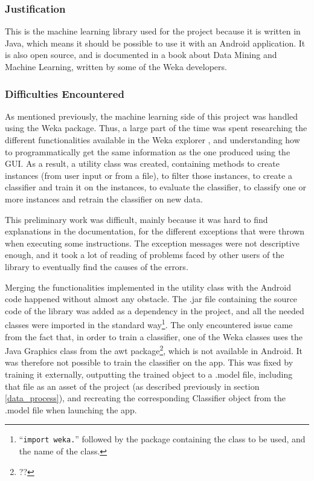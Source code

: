 \documentclass{mproj}
\begin{document}
\subsubsection*{Justification}

This is the machine learning library used for the project because it is written in Java, which means it should be possible to use it with an Android application. It is also open source, and is documented in a book about Data Mining and Machine Learning, written by some of the Weka developers. \cite{wekabook}

\subsubsection*{Difficulties Encountered}

As mentioned previously, the machine learning side of this project was handled using the Weka package. Thus, a large part of the time was spent researching the different functionalities available in the Weka explorer \cite{wekaexplorer}, and understanding how to programmatically get the same information as the one produced using the GUI. As a result, a utility class was created, containing methods to create instances (from user input or from a file), to filter those instances, to create a classifier and train it on the instances, to evaluate the classifier, to classify one or more instances and retrain the classifier on new data. \par

This preliminary work was difficult, mainly because it was hard to find explanations in the documentation, for the different exceptions that were thrown when executing some instructions. The exception messages were not descriptive enough, and it took a lot of reading of problems faced by other users of the library to eventually find the causes of the errors. \par

Merging the functionalities implemented in the utility class with the Android code happened without almost any obstacle. The .jar file containing the source code of the library was added as a dependency in the project, and all the needed classes were imported in the standard way\footnote{``\texttt{import weka.}'' followed by the package containing the class to be used, and the name of the class.}. The only encountered issue came from the fact that, in order to train a classifier, one of the Weka classes uses the Java Graphics class from the awt package\footnote{??}, which is not available in Android. It was therefore not possible to train the classifier on the app. This was fixed by training it externally, outputting the trained object to a .model file, including that file as an asset of the project (as described previously in section \ref{data_process}), and recreating the corresponding Classifier object from the .model file when launching the app.
\end{document}
